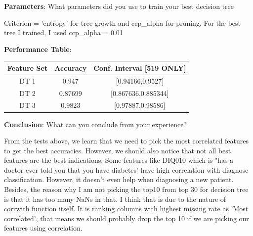 \documentclass{article}
\begin{document}
        \noindent\textbf{Parameters}: What parameters did you use to train your best decision tree
        
        Criterion = 'entropy'  for tree growth and ccp\_alpha for pruning. For the best tree I trained, I used ccp\_alpha = 0.01
        
        \noindent\textbf{Performance Table}: 
        \begin{center}
            \begin{tabular}{|c|c|c|}
                \hline
                Feature Set & Accuracy & Conf. Interval [519 ONLY]\\
                \hline
                DT 1 & 0.947 & [0.94166,0.9527]  \\
                DT 2 & 0.87699 & [0.867636,0.885344]  \\
                DT 3 & 0.9823 &  [0.97887,0.98586] \\
                \hline
        \end{tabular}
                \end{center}
        
        
        
        \textbf{Conclusion}: What can you conclude from your experience?
        
        From the tests above, we learn that we need to pick the most correlated features to get the best accuracies. However, we should also notice that not all best features are the best indications. Some features like DIQ010 which is "has a doctor ever told you that you have diabetes' have high correlation with diagnose classification. However, it doesn't even help when diagnosing a new patient. Besides, the reason why I am not picking the top10 from top 30 for decision tree is that it has too many NaNs in that. I think that is due to the nature of corrwith function itself. It is ranking columns with highest missing rate as 'Most correlated', that means we should probably drop the top 10 if we are picking our features using correlation.
\end{document}
